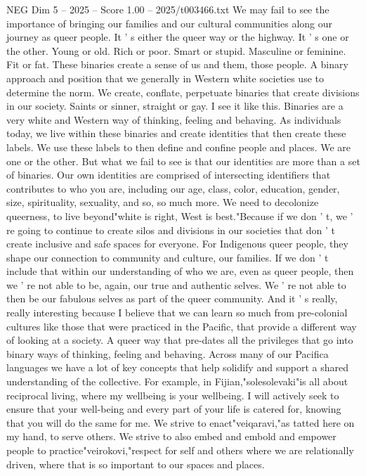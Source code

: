 \begin{textsample}{NEG Dim 5 – 2025 – Score 1.00 – 2025/t003466.txt}
We may fail to see the importance of bringing our families and our cultural communities along our journey as queer people.
It ' s either the queer way or the highway.
It ' s one or the other.
Young or old.
Rich or poor.
Smart or stupid.
Masculine or feminine.
Fit or fat.
These binaries create a sense of us and them, those people.
A binary approach and position that we generally in Western white societies use to determine the norm.
We create, conflate, perpetuate binaries that create divisions in our society.
Saints or sinner, straight or gay.
I see it like this.
Binaries are a very white and Western way of thinking, feeling and behaving.
As individuals today, we live within these binaries and create identities that then create these labels.
We use these labels to then define and confine people and places.
We are one or the other.
But what we fail to see is that our identities are more than a set of binaries.
Our own identities are comprised of intersecting identifiers that contributes to who you are, including our age, class, color, education, gender, size, spirituality, sexuality, and so, so much more.
We need to decolonize queerness, to live beyond"white is right, West is best."Because if we don ' t, we ' re going to continue to create silos and divisions in our societies that don ' t create inclusive and safe spaces for everyone.
For Indigenous queer people, they shape our connection to community and culture, our families.
If we don ' t include that within our understanding of who we are, even as queer people, then we ' re not able to be, again, our true and authentic selves.
We ' re not able to then be our fabulous selves as part of the queer community.
And it ' s really, really interesting because I believe that we can learn so much from pre-colonial cultures like those that were practiced in the Pacific, that provide a different way of looking at a society.
A queer way that pre-dates all the privileges that go into binary ways of thinking, feeling and behaving.
Across many of our Pacifica languages we have a lot of key concepts that help solidify and support a shared understanding of the collective.
For example, in Fijian,"solesolevaki"is all about reciprocal living, where my wellbeing is your wellbeing.
I will actively seek to ensure that your well-being and every part of your life is catered for, knowing that you will do the same for me.
We strive to enact"veiqaravi,"as tatted here on my hand, to serve others.
We strive to also embed and embold and empower people to practice"veirokovi,"respect for self and others where we are relationally driven, where that is so important to our spaces and places.

\end{textsample}
